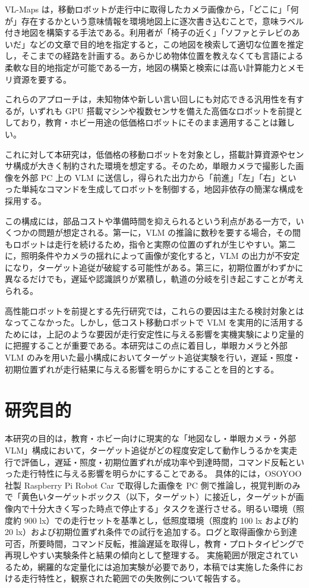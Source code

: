 \documentclass[a4paper,11pt]{ltjsreport}
\begin{document}
VL-Maps は，移動ロボットが走行中に取得したカメラ画像から，「どこに」「何が」存在するかという意味情報を環境地図上に逐次書き込むことで，意味ラベル付き地図を構築する手法である。利用者が「椅子の近く」「ソファとテレビのあいだ」などの文章で目的地を指定すると，この地図を検索して適切な位置を推定し，そこまでの経路を計画する。あらかじめ物体位置を教えなくても言語による柔軟な目的地指定が可能である一方，地図の構築と検索には高い計算能力とメモリ資源を要する。

これらのアプローチは，未知物体や新しい言い回しにも対応できる汎用性を有するが，いずれも GPU 搭載マシンや複数センサを備えた高価なロボットを前提としており，教育・ホビー用途の低価格ロボットにそのまま適用することは難しい。

これに対して本研究は，低価格の移動ロボットを対象とし，搭載計算資源やセンサ構成が大きく制約された環境を想定する。そのため，単眼カメラで撮影した画像を外部 PC 上の VLM に送信し，得られた出力から「前進」「左」「右」といった単純なコマンドを生成してロボットを制御する，地図非依存の簡潔な構成を採用する。

この構成には，部品コストや準備時間を抑えられるという利点がある一方で，いくつかの問題が想定される。第一に，VLM の推論に数秒を要する場合，その間もロボットは走行を続けるため，指令と実際の位置のずれが生じやすい。第二に，照明条件やカメラの揺れによって画像が変化すると，VLM の出力が不安定になり，ターゲット追従が破綻する可能性がある。第三に，初期位置がわずかに異なるだけでも，遅延や認識誤りが累積し，軌道の分岐を引き起こすことが考えられる。

高性能ロボットを前提とする先行研究では，これらの要因は主たる検討対象とはなってこなかった。しかし，低コスト移動ロボットで VLM を実用的に活用するためには，上記のような要因が走行安定性に与える影響を実機実験により定量的に把握することが重要である。本研究はこの点に着目し，単眼カメラと外部 VLM のみを用いた最小構成においてターゲット追従実験を行い，遅延・照度・初期位置ずれが走行結果に与える影響を明らかにすることを目的とする。

\section{研究目的}
本研究の目的は，教育・ホビー向けに現実的な「地図なし・単眼カメラ・外部 VLM」構成において，ターゲット追従がどの程度安定して動作しうるかを実走行で評価し，遅延・照度・初期位置ずれが成功率や到達時間，コマンド反転といった走行特性に与える影響を明らかにすることである。
具体的には，OSOYOO 社製 Raspberry Pi Robot Car で取得した画像を PC 側で推論し，視覚判断のみで「黄色いターゲットボックス（以下，ターゲット）に接近し，ターゲットが画像内で十分大きく写った時点で停止する」タスクを遂行させる。明るい環境（照度約 900 lx）での走行セットを基準とし，低照度環境（照度約 100 lx および約 20 lx）および初期位置ずれ条件での試行を追加する。ログと取得画像から到達可否，所要時間，コマンド反転，推論遅延を取得し，教育・プロトタイピングで再現しやすい実験条件と結果の傾向として整理する。
実施範囲が限定されているため，網羅的な定量化には追加実験が必要であり，本稿では実施した条件における走行特性と，観察された範囲での失敗例について報告する。
\end{document}
